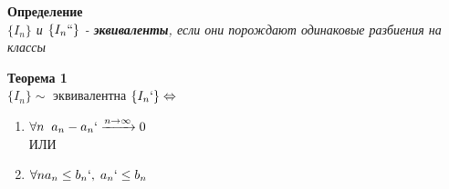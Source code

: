 \documentclass[12pt, paper]{article}
\begin{document}

\begin{tcolorbox}
\textbf{Определение}\\
\textit{$\{I_n\}$ и $\{I_n``\}$ - \textbf{эквиваленты}, если они порождают одинаковые разбиения на классы}
\end{tcolorbox}

\begin{tcolorbox}
\textbf{Теорема 1}\\
$\{ I_n \}\sim$ эквивалентна $\{ I_n` \} \Leftrightarrow$
\begin{enumerate}
    \item $\forall n \;\; a_n - a_n` \xrightarrow{n \to \infty} 0 $\\
    ИЛИ
    \item $\forall n a_n \leq b_n`,\; a_n` \leq b_n$
\end{enumerate}
\end{tcolorbox}
\end{document}
